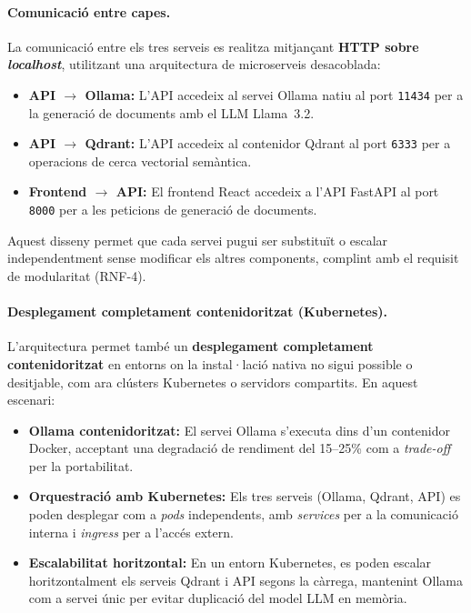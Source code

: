 \documentclass[CAT]{TFUOC}%
\begin{document}
\paragraph{Comunicació entre capes.}

La comunicació entre els tres serveis es realitza mitjançant \textbf{HTTP sobre \textit{localhost}}, utilitzant una arquitectura de microserveis desacoblada:

\begin{itemize}
    \item \textbf{API $\rightarrow$ Ollama:} L'API accedeix al servei Ollama natiu al port \texttt{11434} per a la generació de documents amb el LLM Llama~3.2.
    \item \textbf{API $\rightarrow$ Qdrant:} L'API accedeix al contenidor Qdrant al port \texttt{6333} per a operacions de cerca vectorial semàntica.
    \item \textbf{Frontend $\rightarrow$ API:} El frontend React accedeix a l'API FastAPI al port \texttt{8000} per a les peticions de generació de documents.
\end{itemize}

Aquest disseny permet que cada servei pugui ser substituït o escalar independentment sense modificar els altres components, complint amb el requisit de modularitat (RNF-4).

\paragraph{Desplegament completament contenidoritzat (Kubernetes).}

L'arquitectura permet també un \textbf{desplegament completament contenidoritzat} en entorns on la instal·lació nativa no sigui possible o desitjable, com ara clústers Kubernetes o servidors compartits. En aquest escenari:

\begin{itemize}
    \item \textbf{Ollama contenidoritzat:} El servei Ollama s'executa dins d'un contenidor Docker, acceptant una degradació de rendiment del 15--25\% com a \textit{trade-off} per la portabilitat.
    \item \textbf{Orquestració amb Kubernetes:} Els tres serveis (Ollama, Qdrant, API) es poden desplegar com a \textit{pods} independents, amb \textit{services} per a la comunicació interna i \textit{ingress} per a l'accés extern.
    \item \textbf{Escalabilitat horitzontal:} En un entorn Kubernetes, es poden escalar horitzontalment els serveis Qdrant i API segons la càrrega, mantenint Ollama com a servei únic per evitar duplicació del model LLM en memòria.
\end{itemize}
\end{document}
